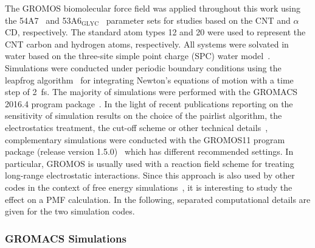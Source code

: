\documentclass[9pt,lessons]{livecoms}
\begin{document}
The GROMOS biomolecular force field was applied throughout this work using the 54A7~\cite{schmid2011definition} and 53A6$_\mathrm{GLYC}$~\cite{pol2012gromos} parameter sets for studies based on the CNT and 
$\alpha$CD, respectively. 
The standard atom types 12 and 20 were used to represent the CNT carbon and hydrogen atoms, respectively. 
All systems were solvated in water based on the three-site simple point charge (SPC) water model~\cite{berendsen1981interaction}.
Simulations were conducted under periodic boundary conditions using the leapfrog algorithm~\cite{eastwood1981computer} for integrating Newton's equations of motion with a time step of 2~fs.
The majority of simulations were performed with the GROMACS 2016.4 program package~\cite{berendsen1995gromacs, hess2008gromacs, abraham2015gromacs}.
In the light of recent publications reporting on the sensitivity of simulation results on the choice of the pairlist algorithm, the electrostatics treatment, the cut-off scheme or other 
technical details~\cite{silva2018impact, gonccalves2019influence, reisser2017real, loeffler2018reproducibility}, complementary simulations were conducted with the GROMOS11 program package (release version 1.5.0)~\cite{kunz2012new, riniker2011calculation, schmid2012architecture} which has different recommended settings.
In particular, GROMOS is usually used with a reaction field scheme for treating long-range electrostatic interactions. Since this approach is also used by other codes in the context of free energy 
simulations~\cite{papadourakis2018blinded, aaqvist2017cold}, it is interesting to study the effect on a PMF calculation.
In the following, separated computational details are given for the two simulation codes.

\subsubsection*{GROMACS Simulations}
\end{document}
